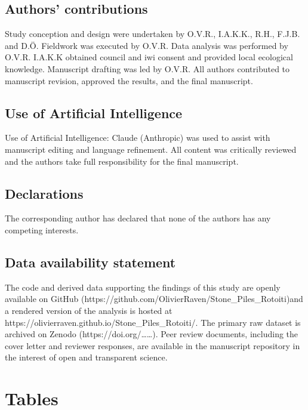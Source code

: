 \documentclass[
  12pt,
  a4paper,
  oneside]{scrbook}
\newcounter{none} %
\begin{document}
\subsection{Authors' contributions}\label{authors-contributions-3}

Study conception and design were undertaken by O.V.R., I.A.K.K., R.H.,
F.J.B. and D.Ö. Fieldwork was executed by O.V.R. Data analysis was
performed by O.V.R. I.A.K.K obtained council and iwi consent and
provided local ecological knowledge. Manuscript drafting was led by
O.V.R. All authors contributed to manuscript revision, approved the
results, and the final manuscript.

\subsection{Use of Artificial
Intelligence}\label{use-of-artificial-intelligence}

Use of Artificial Intelligence: Claude (Anthropic) was used to assist
with manuscript editing and language refinement. All content was
critically reviewed and the authors take full responsibility for the
final manuscript.

\subsection{Declarations}\label{declarations-3}

The corresponding author has declared that none of the authors has any
competing interests.

\subsection{Data availability
statement}\label{data-availability-statement-3}

The code and derived data supporting the findings of this study are
openly available on GitHub
(https://github.com/OlivierRaven/Stone\_Piles\_Rotoiti)and a rendered
version of the analysis is hosted at
https://olivierraven.github.io/Stone\_Piles\_Rotoiti/. The primary raw
dataset is archived on Zenodo (https://doi.org/\ldots\ldots). Peer
review documents, including the cover letter and reviewer responses, are
available in the manuscript repository in the interest of open and
transparent science.

\section{Tables}\label{tables-2}
\end{document}
